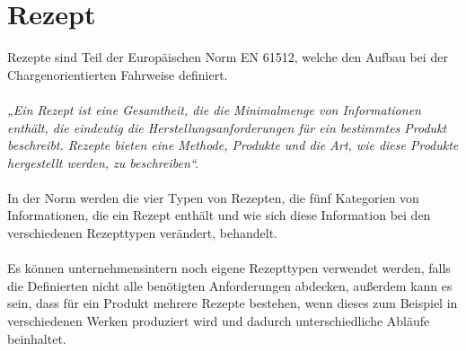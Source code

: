 \section{Rezept}
Rezepte sind Teil der Europäischen Norm EN 61512, welche den Aufbau bei der Chargenorientierten Fahrweise definiert.\\\\
\textit{„Ein Rezept ist eine Gesamtheit, die die Minimalmenge von Informationen enthält, die eindeutig die Herstellungsanforderungen für ein bestimmtes Produkt beschreibt. Rezepte bieten eine Methode, Produkte und die Art, wie diese Produkte hergestellt werden, zu beschreiben“.} \cite{en61512}\\\\
In der Norm werden die vier Typen von Rezepten, die fünf Kategorien von Informationen, die ein Rezept enthält und wie sich diese Information bei den verschiedenen Rezepttypen verändert, behandelt.\\\\
Es können unternehmensintern noch eigene Rezepttypen verwendet werden, falls die Definierten nicht alle benötigten Anforderungen abdecken, außerdem kann es sein, dass für ein Produkt mehrere Rezepte bestehen, wenn dieses zum Beispiel in verschiedenen Werken produziert wird und dadurch unterschiedliche Abläufe beinhaltet. \cite{en61512}\\

